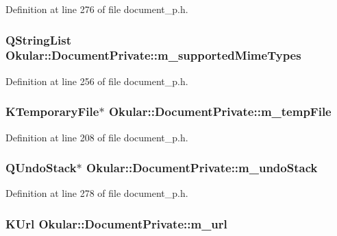 Definition at line 276 of file document\+\_\+p.\+h.

\hypertarget{classOkular_1_1DocumentPrivate_a4150d34c787b214e91672cd197df9835}{
\subsubsection[{m\+\_\+supported\+Mime\+Types}]{\setlength{\rightskip}{0pt plus 5cm}Q\+String\+List Okular\+::\+Document\+Private\+::m\+\_\+supported\+Mime\+Types}}\label{classOkular_1_1DocumentPrivate_a4150d34c787b214e91672cd197df9835}


Definition at line 256 of file document\+\_\+p.\+h.

\hypertarget{classOkular_1_1DocumentPrivate_a09a610ec7c029dd3b73580abfc65059d}{
\subsubsection[{m\+\_\+temp\+File}]{\setlength{\rightskip}{0pt plus 5cm}K\+Temporary\+File$\ast$ Okular\+::\+Document\+Private\+::m\+\_\+temp\+File}}\label{classOkular_1_1DocumentPrivate_a09a610ec7c029dd3b73580abfc65059d}


Definition at line 208 of file document\+\_\+p.\+h.

\hypertarget{classOkular_1_1DocumentPrivate_a64bc3f1453fc2312423889c869d89a73}{
\subsubsection[{m\+\_\+undo\+Stack}]{\setlength{\rightskip}{0pt plus 5cm}Q\+Undo\+Stack$\ast$ Okular\+::\+Document\+Private\+::m\+\_\+undo\+Stack}}\label{classOkular_1_1DocumentPrivate_a64bc3f1453fc2312423889c869d89a73}


Definition at line 278 of file document\+\_\+p.\+h.

\hypertarget{classOkular_1_1DocumentPrivate_a1a0145bbb16d15c016000a83d0d2ab2b}{
\subsubsection[{m\+\_\+url}]{\setlength{\rightskip}{0pt plus 5cm}K\+Url Okular\+::\+Document\+Private\+::m\+\_\+url}}\label{classOkular_1_1DocumentPrivate_a1a0145bbb16d15c016000a83d0d2ab2b}


